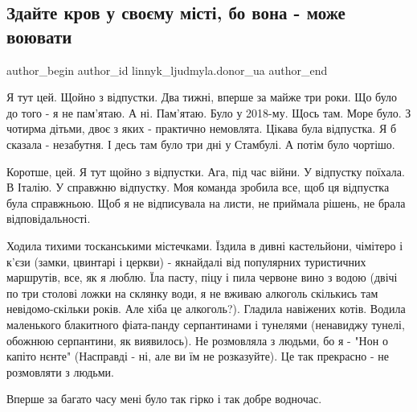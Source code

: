  
 
 
 
 

\subsection{Здайте кров у своєму місті, бо вона - може воювати}
\label{sec:19_01_2023.fb.linnyk_ljudmyla.donor_ua.1.zdaite_krov_u_svo_mu}

\ifcmt
 author_begin
   author_id linnyk_ljudmyla.donor_ua
 author_end
\fi

Я тут цей. Щойно з відпустки. Два тижні, вперше за майже три роки. Що було до
того - я не пам'ятаю. А ні. Пам'ятаю. Було у 2018-му. Щось там. Море було. З
чотирма дітьми, двоє з яких - практично немовлята. Цікава була відпустка. Я б
сказала - незабутня. І десь там було три дні у Стамбулі. А потім було чортішо. 

Коротше, цей. Я тут щойно з відпустки. Ага, під час війни. У відпустку поїхала.
В Італію. У справжню відпустку. Моя команда зробила все, щоб ця відпустка була
справжньою. Щоб я не відписувала на листи, не приймала рішень, не брала
відповідальності. 

Ходила тихими тосканськими містечками. Їздила в дивні кастельйони, чімітеро і
к'єзи (замки, цвинтарі і церкви) - якнайдалі від популярних туристичних
маршрутів, все, як я люблю. Їла пасту, піцу і пила червоне вино з водою (двічі
по три столові ложки на склянку води, я не вживаю алкоголь скількись там
невідомо-скільки років. Але хіба це алкоголь?). Гладила навіжених котів. Водила
маленького блакитного фіата-панду серпантинами і тунелями (ненавиджу тунелі,
обожнюю серпантини, як виявилось). Не розмовляла з людьми, бо я - "Нон о капіто
нєнте" (Насправді - ні, але ви їм не розказуйте). Це так прекрасно - не
розмовляти з людьми. 

Вперше за багато часу мені було так гірко і так добре водночас. 

